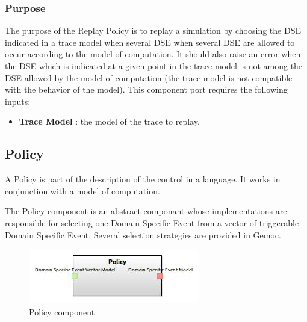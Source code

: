 \documentclass{gemoc} %
\begin{document}
\subsubsection{Purpose}
The purpose of the Replay Policy is to replay a simulation by choosing the DSE indicated in a trace model when several DSE when several DSE are allowed to occur according to the model of computation. It should also raise an error when the DSE which is indicated at a given point in the trace model is not among the DSE allowed by the model of computation (the trace model is not compatible with the behavior of the model).
This component port requires the following inputs:
\begin{itemize}
  \item \textbf{Trace Model} :
  the model of the trace to replay.
\end{itemize}


\subsection{Policy}
A Policy is part of the description of the control in a language. It works in conjunction with a model of computation.

The Policy component is an abstract componant whose implementations are responsible for selecting one Domain Specific Event from a vector of triggerable Domain Specific Event. Several selection strategies are provided in Gemoc.
\begin{figure}[htp]
	\begin{center}
	\includegraphics*[trim=0.0cm 0.0cm 0cm 0.0cm, clip=true, scale=1.0]{../images/generated/Generated_Policy.jpg}
	\caption{Policy component}
	\end{center}
\end{figure}
\end{document}

